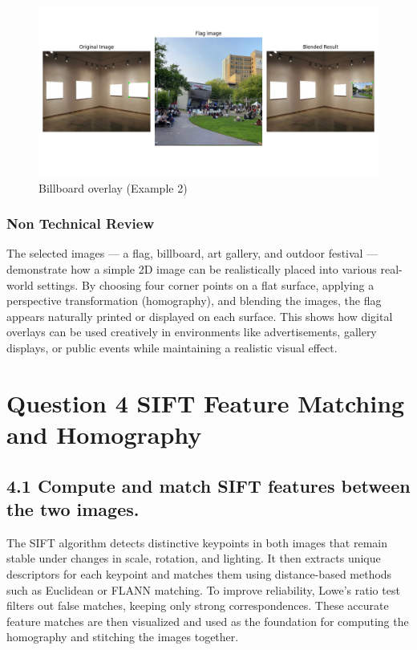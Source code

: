 \documentclass[10pt,a4paper,twocolumn]{article}
\begin{document}
\begin{figure}[H]
    \centering
    \includegraphics[width=0.95\columnwidth]{fig/Figure_2.png}
    \caption{Billboard overlay (Example 2) }
    \label{fig:q3_billboard_ex2}
\end{figure}
\subsubsection{Non Technical Review}
The selected images — a flag, billboard, art gallery, and outdoor festival — demonstrate how a simple 2D image can be realistically placed into various real-world settings. By choosing four corner points on a flat surface, applying a perspective transformation (homography), and blending the images, the flag appears naturally printed or displayed on each surface. This shows how digital overlays can be used creatively in environments like advertisements, gallery displays, or public events while maintaining a realistic visual effect.

\section{Question 4 SIFT Feature Matching and Homography}


\subsection*{4.1  Compute and match SIFT features between the two images.}

The SIFT algorithm detects distinctive keypoints in both images that remain stable under changes in scale, rotation, and lighting. It then extracts unique descriptors for each keypoint and matches them using distance-based methods such as Euclidean or FLANN matching. To improve reliability, Lowe’s ratio test filters out false matches, keeping only strong correspondences. These accurate feature matches are then visualized and used as the foundation for computing the homography and stitching the images together.
\end{document}
